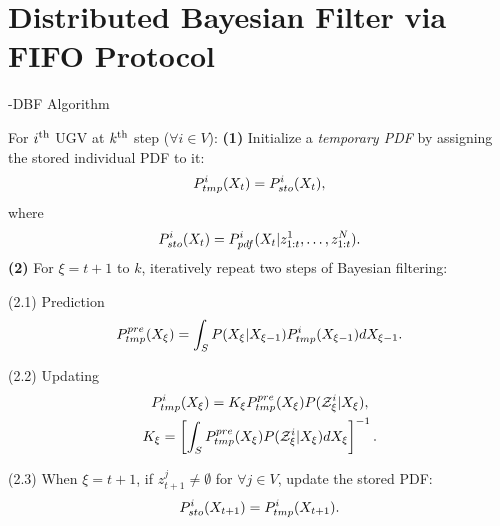 \section{Distributed Bayesian Filter via FIFO Protocol}\label{sec:\proto-dbf}
	
		\begin{algorithm}
			\caption{\proto-DBF Algorithm}\label{alg:lifo-dbf}
			\begin{algorithmic}
				\State For $i^\text{th}$ UGV at $k^\text{th}$ step ($\forall i\in V$):
				\State\textbf{(1)} Initialize a \textit{temporary PDF} by assigning the stored individual PDF to it:
				\small\begin{equation*}
				P^i_{tmp}(X_{t})= P^i_{sto}(X_t),
				\end{equation*}\normalsize		
				where %
				\small\begin{equation*}
				P^i_{sto}(X_t) = P^i_{pdf}(X_{t}|z^1_{1:t},\dots,z^N_{1:t}).
				\end{equation*}\normalsize	
				\State\textbf{(2)} For $\xi=t+1$ to $k$, iteratively repeat two steps of Bayesian filtering:
				
				\State(2.1) Prediction 
				\small\begin{equation*}
				P_{tmp}^{pre}(X_{\xi})=\int_{S} P(X_{\xi}|X_{\xi-1})P^i_{tmp}(X_{\xi-1})dX_{\xi-1}.
				\end{equation*} \normalsize
				
				\State(2.2) Updating
				\small\begin{gather*}
				P^i_{tmp}(X_{\xi})=K_{\xi} P_{tmp}^{pre}(X_{\xi})P(\mathcal{Z}^i_{\xi}|X_{\xi}),\\
				K_{\xi}=\left[\int_S P_{tmp}^{pre}(X_{\xi})P(\mathcal{Z}^i_{\xi}|X_{\xi})dX_{\xi}\right]^{-1}.
				\end{gather*} \normalsize
				
				\State(2.3) When $\xi=t+1$, if $z^j_{t+1}\neq\emptyset$ for $\forall j\in V$, update the stored PDF:
				\small\begin{equation*}
				P^i_{sto}(X_{t+1})=P^i_{tmp}(X_{t+1}).
				\end{equation*}\normalsize
				

\end{algorithmic}
\end{algorithm}
